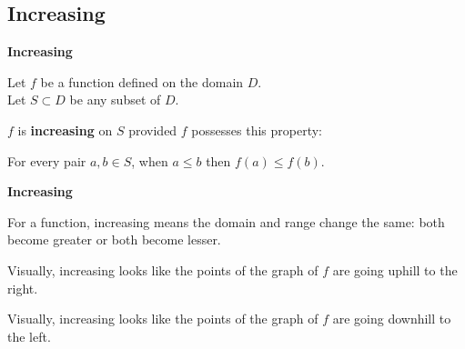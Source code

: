 \documentclass{ximera}
\begin{document}
\subsection*{Increasing}



\begin{definition} \textbf{\textcolor{green!50!black}{Increasing}} 


Let $f$ be a function defined on the domain $D$. \\
Let $S \subset D$ be any subset of $D$.

$f$ is \textbf{increasing} on $S$ provided $f$ possesses this property:  


\begin{center}
For every pair $a, b \in S$, when $a \leq b$ then $f(a) \leq f(b)$.
\end{center}

\end{definition}




\begin{idea} \textbf{\textcolor{blue!55!black}{Increasing}}

For a function, increasing means the domain and range change the same: both become greater or both become lesser.

\end{idea}



\begin{observation}
Visually, increasing looks like the points of the graph of $f$ are going uphill to the right.
\end{observation}


\begin{observation}
Visually, increasing looks like the points of the graph of $f$ are going downhill to the left.
\end{observation}





\newpage
\end{document}
